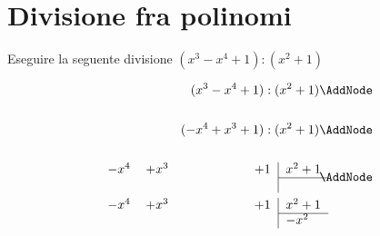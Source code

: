 \section{Divisione fra polinomi}
\begin{esempiot}{}{}
Eseguire la seguente divisione $(x^3-x^4+1):(x^2+1)$
\end{esempiot}
\begin{NodesList}
\begin{align*}
(x^3-x^4+1):(x^2+1)&\AddNode\\
&\\
(-x^4+x^3+1):(x^2+1)&\AddNode\\
&\\
\begin{minipage}[t]{0.5\textwidth}
\begin{tabular}{lllll|l}
$-x^4$& $+x^3$ & \phantom{$-x^2$} &\phantom{$-x$}  &$+1$&$ x^2+1$\\ 
\cline{6-6}&&&&&
\\
\end{tabular}
\end{minipage}&\AddNode\\
\begin{minipage}[t]{0.5\textwidth}
\begin{tabular}{lllll|l}
$-x^4$& $+x^3$ &\phantom{$-x^2$}  &\phantom{$-x$}  &$+1$&$ x^2+1$\\ 
\cline{6-6}&&&&&$-x^2$
\\

\end{tabular}
\end{minipage}
\end{align*}
\end{NodesList}
